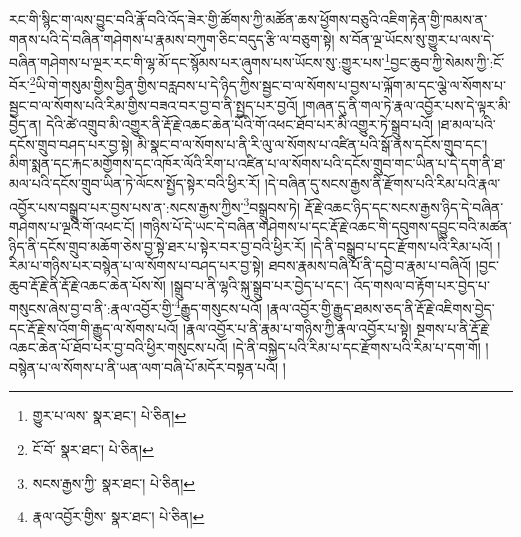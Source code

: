 རང་གི་སྙིང་ག་ལས་བྱུང་བའི་རྣོ་བའི་འོད་ཟེར་གྱི་ཚོགས་ཀྱི་མཚོན་ཆས་ཕྱོགས་བཅུའི་འཇིག་རྟེན་གྱི་ཁམས་ན་གནས་པའི་དེ་བཞིན་གཤེགས་པ་རྣམས་བཀུག་ཅིང་བདུད་རྩི་ལ་བཅུག་སྟེ། ས་བོན་ལྔ་ཡོངས་སུ་གྱུར་པ་ལས་དེ་བཞིན་གཤེགས་པ་ལྔར་རང་གི་ལྷ་མོ་དང་སྙོམས་པར་ཞུགས་པས་ཡོངས་སུ་:གྱུར་པས་\footnote{གྱུར་པ་ལས་  སྣར་ཐང་།  པེ་ཅིན། }བྱང་ཆུབ་ཀྱི་སེམས་ཀྱི་:ངོ་བོར་\footnote{ངོ་བོ་  སྣར་ཐང་།  པེ་ཅིན། }ཡི་གེ་གསུམ་གྱིས་བྱིན་གྱིས་བརླབས་པ་དེ་ཉིད་ཀྱིས་སྦྱང་བ་ལ་སོགས་པ་བྱས་པ་ལྐོག་མ་དང་ལྕེ་ལ་སོགས་པ་སྦྱང་བ་ལ་སོགས་པའི་རིམ་གྱིས་བཟའ་བར་བྱ་བ་ནི་སྤྱད་པར་བྱའོ། །གཞན་དུ་ནི་གལ་ཏེ་རྣལ་འབྱོར་པས་དེ་ལྟར་མི་བྱེད་ན། དེའི་ཚེ་འགྲུབ་མི་འགྱུར་ནི་རྡོ་རྗེ་འཆང་ཆེན་པོའི་གོ་འཕང་ཐོབ་པར་མི་འགྱུར་ཏེ་སྒྲུབ་པའོ། །ཐ་མལ་པའི་དངོས་གྲུབ་བཤད་པར་བྱ་སྟེ། མི་སྣང་བ་ལ་སོགས་པ་ནི་རི་ལུ་ལ་སོགས་པ་འཛིན་པའི་སྒོ་ནས་དངོས་གྲུབ་དང་། མིག་སྨན་དང་རྐང་མགྱོགས་དང་འཁོར་ལོའི་རིག་པ་འཛིན་པ་ལ་སོགས་པའི་དངོས་གྲུབ་གང་ཡིན་པ་དེ་དག་ནི་ཐ་མལ་པའི་དངོས་གྲུབ་ཡིན་ཏེ་ལོངས་སྤྱོད་སྟེར་བའི་ཕྱིར་རོ། །དེ་བཞིན་དུ་སངས་རྒྱས་ནི་རྫོགས་པའི་རིམ་པའི་རྣལ་འབྱོར་པས་བསྒྲུབ་པར་བྱས་པས་ན་:སངས་རྒྱས་ཀྱིས་\footnote{སངས་རྒྱས་ཀྱི་  སྣར་ཐང་།  པེ་ཅིན། }བསྒྲུབས་ཏེ། རྡོ་རྗེ་འཆང་ཉིད་དང་སངས་རྒྱས་ཉིད་དེ་བཞིན་གཤེགས་པ་ལྔའི་གོ་འཕང་ངོ། །གཉིས་པོ་དེ་ཡང་དེ་བཞིན་གཤེགས་པ་དང་རྡོ་རྗེ་འཆང་གི་དབུགས་དབྱུང་བའི་མཚན་ཉིད་ནི་དངོས་གྲུབ་མཆོག་ཅེས་བྱ་སྟེ་ཐར་པ་སྟེར་བར་བྱ་བའི་ཕྱིར་རོ། །དེ་ནི་བསྒྲུབ་པ་དང་རྫོགས་པའི་རིམ་པའོ། །རིམ་པ་གཉིས་པར་བསྙེན་པ་ལ་སོགས་པ་བཤད་པར་བྱ་སྟེ། ཐབས་རྣམས་བཞི་པོ་ནི་དབྱེ་བ་རྣམ་པ་བཞིའོ། །བྱང་ཆུབ་རྡོ་རྗེ་ནི་རྡོ་རྗེ་འཆང་ཆེན་པོས་སོ། །སྒྲུབ་པ་ནི་ལྷའི་སྐུ་སྒྲུབ་པར་བྱེད་པ་དང་། འོད་གསལ་བ་རྟོག་པར་བྱེད་པ་གསུངས་ཞེས་བྱ་བ་ནི་:རྣལ་འབྱོར་གྱི་\footnote{རྣལ་འབྱོར་གྱིས་  སྣར་ཐང་།  པེ་ཅིན། }རྒྱུད་གསུངས་པའོ། །རྣལ་འབྱོར་གྱི་རྒྱུད་ཐམས་ཅད་ནི་རྡོ་རྗེ་འཇིགས་བྱེད་དང་རྡོ་རྗེ་ས་འོག་གི་རྒྱུད་ལ་སོགས་པའོ། །རྣལ་འབྱོར་པ་ནི་རྣམ་པ་གཉིས་ཀྱི་རྣལ་འབྱོར་པ་སྟེ། སྔགས་པ་ནི་རྡོ་རྗེ་འཆང་ཆེན་པོ་ཐོབ་པར་བྱ་བའི་ཕྱིར་གསུངས་པའོ། །དེ་ནི་བསྐྱེད་པའི་རིམ་པ་དང་རྫོགས་པའི་རིམ་པ་དག་གོ། །བསྙེན་པ་ལ་སོགས་པ་ནི་ཡན་ལག་བཞི་པོ་མདོར་བསྟན་པའོ། །
